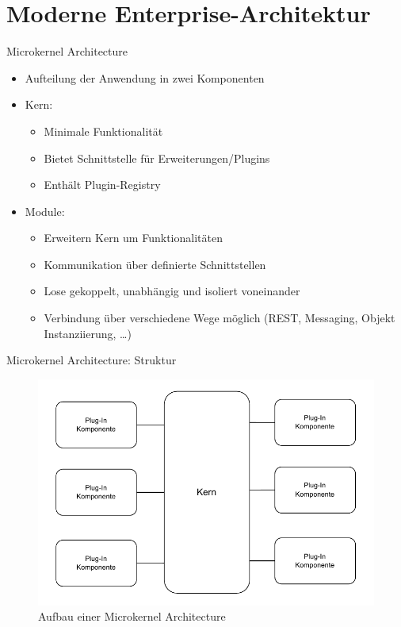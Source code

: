 \section{Moderne Enterprise-Architektur}


\begin{frame}{Microkernel Architecture}
    \begin{itemize}
        \item Aufteilung der Anwendung in zwei Komponenten~\cite{architecturePatterns}
        \item Kern:
        \begin{itemize}
            \item Minimale Funktionalität
            \item Bietet Schnittstelle für Erweiterungen/Plugins
            \item Enthält Plugin-Registry
        \end{itemize}
        \item Module:
        \begin{itemize}
            \item Erweitern Kern um Funktionalitäten
            \item Kommunikation über definierte Schnittstellen
            \item Lose gekoppelt, unabhängig und isoliert voneinander
            \item Verbindung über verschiedene Wege möglich (REST, Messaging, Objekt Instanziierung, \ldots)
            \end{itemize}
    \end{itemize}
\end{frame}

\begin{frame}{Microkernel Architecture: Struktur}
    \begin{figure}[!h]
        \centering
        \includegraphics[scale=0.55]{imglib/microkernel/microkernel}
        \caption{Aufbau einer Microkernel Architecture}
        \label{fig:microkernel}
    \end{figure}
\end{frame}


